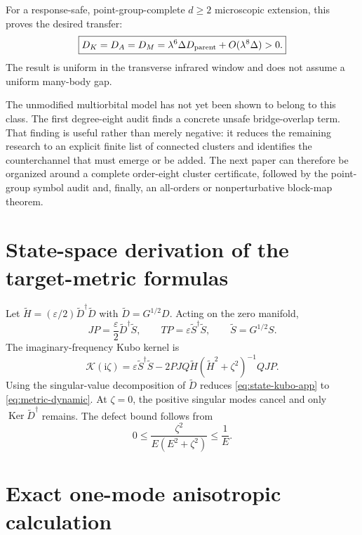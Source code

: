 \documentclass[11pt]{article}
\theoremstyle{definition}
\theoremstyle{remark}
\newcommand{\cK}{\mathcal K}
\newcommand{\Ker}{\operatorname{Ker}}
\newcommand{\I}{\mathrm i}
\newcommand{\eps}{\varepsilon}
\begin{document}
For a response-safe, point-group-complete $d\ge2$ microscopic extension, this
proves the desired transfer:
\begin{equation}
 \boxed{
 D_K=D_A=D_M
 =\lambda^6\Delta D_{\rm parent}+O(\lambda^8\Delta)>0.}
 \label{eq:final-box}
\end{equation}
The result is uniform in the transverse infrared window and does not assume a
uniform many-body gap.

The unmodified multiorbital model has not yet been shown to belong to this
class.  The first degree-eight audit finds a concrete unsafe bridge-overlap
term.  That finding is useful rather than merely negative: it reduces the
remaining research to an explicit finite list of connected clusters and
identifies the counterchannel that must emerge or be added.  The next paper can
therefore be organized around a complete order-eight cluster certificate,
followed by the point-group symbol audit and, finally, an all-orders or
nonperturbative block-map theorem.

\appendix

\section{State-space derivation of the target-metric formulas}

Let $\widetilde H=(\eps/2)\widetilde D^\dagger\widetilde D$ with
$\widetilde D=G^{1/2}D$.  Acting on the zero manifold,
\begin{equation}
 JP=\frac\eps2\widetilde D^\dagger\widetilde S,
 \qquad
 TP=\eps\widetilde S^\dagger\widetilde S,
 \qquad
 \widetilde S=G^{1/2}S.
\end{equation}
The imaginary-frequency Kubo kernel is
\begin{equation}
 \cK(\I\zeta)
 =\eps\widetilde S^\dagger\widetilde S
 -2PJQ\widetilde H(\widetilde H^2+\zeta^2)^{-1}QJP.
 \label{eq:state-kubo-app}
\end{equation}
Using the singular-value decomposition of $\widetilde D$ reduces
\eqref{eq:state-kubo-app} to \eqref{eq:metric-dynamic}.  At $\zeta=0$, the
positive singular modes cancel and only $\Ker\widetilde D^\dagger$ remains.
The defect bound follows from
\begin{equation}
 0\le\frac{\zeta^2}{E(E^2+\zeta^2)}\le\frac1E.
\end{equation}

\section{Exact one-mode anisotropic calculation}
\end{document}
